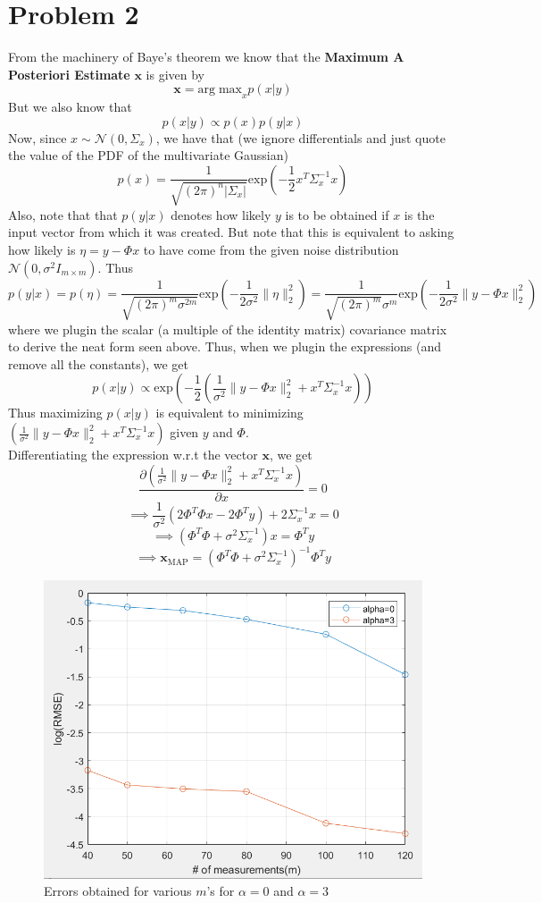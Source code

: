 \documentclass[a4paper,14pt]{article}
\numberwithin{definition}{section}
\numberwithin{mytheorem}{subsection}
\begin{document}
\section{Problem 2}
From the machinery of Baye's theorem we know that the \textbf{Maximum A Posteriori Estimate} $\boldsymbol{x}$ is given by
$$\boldsymbol{x} = \mathrm{arg\;max}_x p(x|y)$$
But we also know that
$$p(x|y)\propto p(x)p(y|x)$$
Now, since $x\sim\mathcal{N}(0,\Sigma_x)$, we have that (we ignore differentials and just quote the value of the PDF of the multivariate Gaussian)
$$p(x) = \frac{1}{\sqrt{(2\pi)^n|\Sigma_x|}}\mathrm{exp}(-\frac{1}{2}x^T\Sigma_x^{-1}x)$$
Also, note that that $p(y|x)$ denotes how likely $y$ is to be obtained if $x$ is the input vector from which it was created. But note that this is equivalent to asking how likely is $\eta = y - \Phi x$ to have come from the given noise distribution $\mathcal{N}(0, \sigma^2I_{m\times m})$. Thus
$$p(y|x) = p(\eta) = \frac{1}{\sqrt{(2\pi)^m\sigma^{2m}}}\mathrm{exp}(-\frac{1}{2\sigma^2}\lVert\eta\rVert^2_2) = \frac{1}{\sqrt{(2\pi)^m}\sigma^{m}}\mathrm{exp}(-\frac{1}{2\sigma^2}\lVert y-\Phi x\rVert^2_2)$$
where we plugin the scalar (a multiple of the identity matrix) covariance matrix to derive the neat form seen above.
Thus, when we plugin the expressions (and remove all the constants), we get
$$p(x|y) \propto \mathrm{exp}(-\frac{1}{2}(\frac{1}{\sigma^2}\lVert y-\Phi x\rVert^2_2 + x^T\Sigma_x^{-1}x))$$
Thus maximizing $p(x|y)$ is equivalent to minimizing $(\frac{1}{\sigma^2}\lVert y-\Phi x\rVert^2_2 + x^T\Sigma_x^{-1}x)$ given $y$ and $\Phi$.\\
Differentiating the expression w.r.t the vector $\boldsymbol{x}$, we get
$$\frac{\partial(\frac{1}{\sigma^2}\lVert y-\Phi x\rVert^2_2 + x^T\Sigma_x^{-1}x)}{\partial x} = 0$$
$$\implies \frac{1}{\sigma^2}(2\Phi^T\Phi x - 2\Phi^Ty) + 2\Sigma_x^{-1}x = 0$$
$$\implies (\Phi^T\Phi + \sigma^2\Sigma_x^{-1})x = \Phi^Ty$$
$$\implies \boldsymbol{x}_{\mathrm{MAP}} = (\Phi^T\Phi + \sigma^2\Sigma_x^{-1})^{-1}\Phi^Ty$$
\begin{figure}
    \includegraphics{Q2.png}
    \caption{Errors obtained for various $m$'s for $\alpha = 0$ and $\alpha = 3$}
\end{figure}
\end{document}
